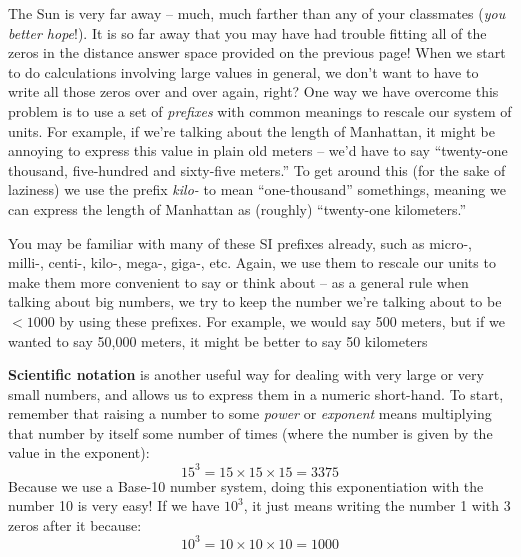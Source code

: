 \documentclass[12pt]{article}
\begin{document}

\clearpage

The Sun is very far away -- much, much farther than any of your classmates (\textit{you better hope}!). It is so far away that you may have had trouble fitting all of the zeros in the distance answer space provided on the previous page! When we start to do calculations involving large values in general, we don't want to have to write all those zeros over and over again, right? One way we have overcome this problem is to use a set of \textit{prefixes} with common meanings to rescale our system of units. For example, if we're talking about the length of Manhattan, it might be annoying to express this value in plain old meters -- we'd have to say ``twenty-one thousand, five-hundred and sixty-five meters.'' To get around this (for the sake of laziness) we use the prefix \textit{kilo-} to mean ``one-thousand'' somethings, meaning we can express the length of Manhattan as (roughly) ``twenty-one kilometers.''

You may be familiar with many of these SI prefixes already, such as micro-, milli-, centi-, kilo-, mega-, giga-, etc. Again, we use them to rescale our units to make them more convenient to say or think about -- as a general rule when talking about big numbers, we try to keep the number we're talking about to be $<1000$ by using these prefixes. For example, we would say 500 meters, but if we wanted to say 50,000 meters, it might be better to say 50 kilometers

\textbf{Scientific notation} is another useful way for dealing with very large or very small numbers, and allows us to express them in a numeric short-hand. To start, remember that raising a number to some \textit{power} or \textit{exponent} means multiplying that number by itself some number of times (where the number is given by the value in the exponent): 
\begin{equation*}
	15^3 = 15\times15\times15 = 3375
\end{equation*}
Because we use a Base-10 number system, doing this exponentiation with the number 10 is very easy! If we have $10^3$, it just means writing the number 1 with 3 zeros after it because:
\begin{equation*}
	10^3 = 10\times10\times10 = 1000
\end{equation*}
\end{document}
